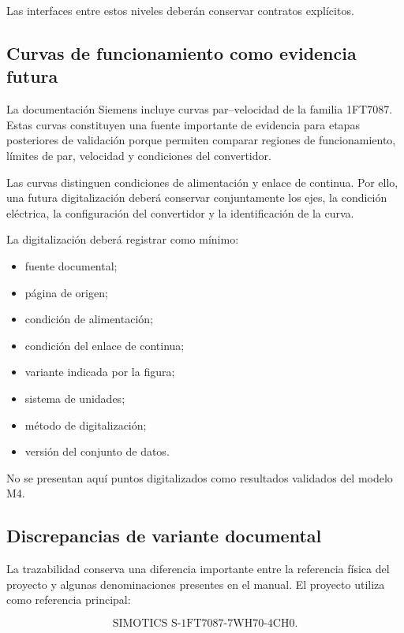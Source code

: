 Las interfaces entre estos niveles deberán conservar contratos explícitos.

\subsection{Curvas de funcionamiento como evidencia futura}

La documentación Siemens incluye curvas par--velocidad de la familia 1FT7087. Estas curvas constituyen una fuente importante de evidencia para etapas posteriores de validación porque permiten comparar regiones de funcionamiento, límites de par, velocidad y condiciones del convertidor.

Las curvas distinguen condiciones de alimentación y enlace de continua. Por ello, una futura digitalización deberá conservar conjuntamente los ejes, la condición eléctrica, la configuración del convertidor y la identificación de la curva.

La digitalización deberá registrar como mínimo:

\begin{itemize}
    \item fuente documental;
    \item página de origen;
    \item condición de alimentación;
    \item condición del enlace de continua;
    \item variante indicada por la figura;
    \item sistema de unidades;
    \item método de digitalización;
    \item versión del conjunto de datos.
\end{itemize}

No se presentan aquí puntos digitalizados como resultados validados del modelo M4.

\subsection{Discrepancias de variante documental}

La trazabilidad conserva una diferencia importante entre la referencia física del proyecto y algunas denominaciones presentes en el manual. El proyecto utiliza como referencia principal:

\begin{equation}
\text{SIMOTICS S-1FT7087-7WH70-4CH0}.
\end{equation}

